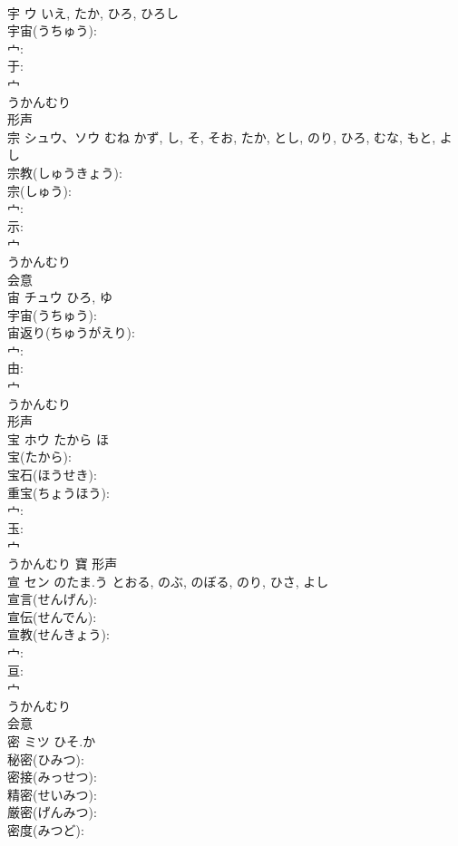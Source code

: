 \documentclass[8pt]{extreport}
\begin{document}
\begin{CJK}{UTF8}{min}
\\	宇	ウ		いえ, たか, ひろ, ひろし	
\\	宇宙(うちゅう): 
\\	宀: 
\\	于: 
\\	宀	
\\	うかんむり	
\\	形声 
\\	宗	シュウ、ソウ	むね	かず, し, そ, そお, たか, とし, のり, ひろ, むな, もと, よし	
\\	宗教(しゅうきょう): 
\\	宗(しゅう): 
\\	宀: 
\\	示: 
\\	宀	
\\	うかんむり	
\\	会意 
\\	宙	チュウ		ひろ, ゆ	
\\	宇宙(うちゅう): 
\\	宙返り(ちゅうがえり): 
\\	宀: 
\\	由: 
\\	宀	
\\	うかんむり	
\\	形声 
\\	宝	ホウ	たから	ほ	
\\	宝(たから): 
\\	宝石(ほうせき): 
\\	重宝(ちょうほう): 
\\	宀: 
\\	玉: 
\\	宀	
\\	うかんむり	寶	形声 
\\	宣	セン	のたま.う	とおる, のぶ, のぼる, のり, ひさ, よし	
\\	宣言(せんげん): 
\\	宣伝(せんでん): 
\\	宣教(せんきょう): 
\\	宀: 
\\	亘: 
\\	宀	
\\	うかんむり	
\\	会意 
\\	密	ミツ	ひそ.か		
\\	秘密(ひみつ): 
\\	密接(みっせつ): 
\\	精密(せいみつ): 
\\	厳密(げんみつ): 
\\	密度(みつど): 

\end{CJK}
\end{document}
